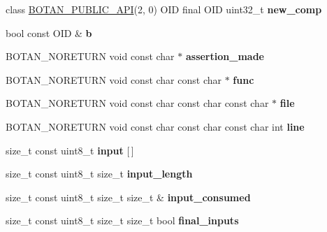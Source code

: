 \begin{DoxyCompactItemize}
\mbox{\label{namespace_botan_a208fee569d7b08fa981f19dfea0cec43}} 
class \hyperlink{namespace_botan_a6b9388030d872e586a4655b776ac9501}{B\+O\+T\+A\+N\+\_\+\+P\+U\+B\+L\+I\+C\+\_\+\+A\+PI}(2, 0) O\+ID final O\+ID uint32\+\_\+t {\bfseries new\+\_\+comp}
\item 
\mbox{\label{namespace_botan_a377230281adf76b940163a9b9336a5df}} 
bool const O\+ID \& {\bfseries b}
\item 
\mbox{\label{namespace_botan_a02dd8106a4e2a1e8b14f10a62bc5d011}} 
B\+O\+T\+A\+N\+\_\+\+N\+O\+R\+E\+T\+U\+RN void const char $\ast$ {\bfseries assertion\+\_\+made}
\item 
\mbox{\label{namespace_botan_adc0a49f2f4af42548f0b748f3452c56a}} 
B\+O\+T\+A\+N\+\_\+\+N\+O\+R\+E\+T\+U\+RN void const char const char $\ast$ {\bfseries func}
\item 
\mbox{\label{namespace_botan_ad5cb3409368a714bfa1817110e1b9045}} 
B\+O\+T\+A\+N\+\_\+\+N\+O\+R\+E\+T\+U\+RN void const char const char const char $\ast$ {\bfseries file}
\item 
\mbox{\label{namespace_botan_a8fbfe51a6f9e53decf26de4e87617414}} 
B\+O\+T\+A\+N\+\_\+\+N\+O\+R\+E\+T\+U\+RN void const char const char const char int {\bfseries line}
\item 
\mbox{\label{namespace_botan_afaa12eb473d17851eaf0041b4fbf51f5}} 
size\+\_\+t const uint8\+\_\+t {\bfseries input} \mbox{[}$\,$\mbox{]}
\item 
\mbox{\label{namespace_botan_a257a507d4f39f711164d0034eb76e3fc}} 
size\+\_\+t const uint8\+\_\+t size\+\_\+t {\bfseries input\+\_\+length}
\item 
\mbox{\label{namespace_botan_a557affd0df05877203fcde9e879430e0}} 
size\+\_\+t const uint8\+\_\+t size\+\_\+t size\+\_\+t \& {\bfseries input\+\_\+consumed}
\item 
\mbox{\label{namespace_botan_a359a4639d84ac68c8ba18fa1205285fa}} 
size\+\_\+t const uint8\+\_\+t size\+\_\+t size\+\_\+t bool {\bfseries final\+\_\+inputs}

\end{DoxyCompactItemize}
